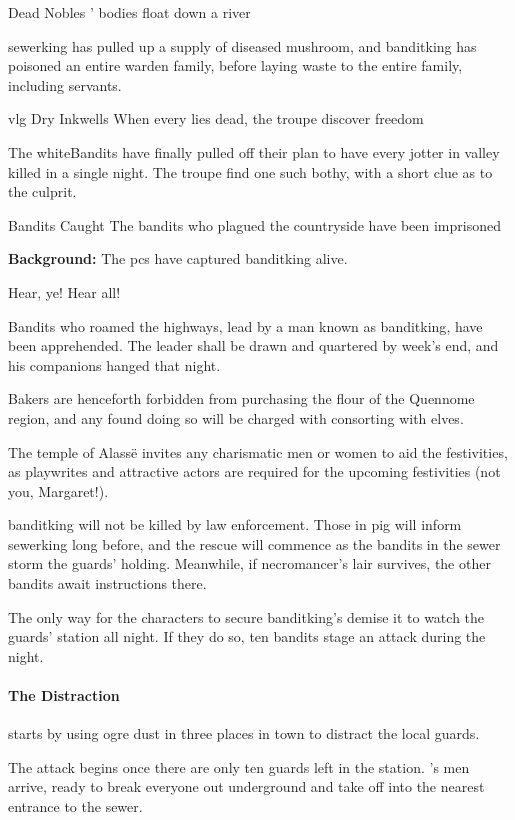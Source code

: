 {Dead Nobles}%
{' bodies float down a river}%

\Gls{sewerking} has pulled up a supply of diseased mushroom, and \gls{banditking} has poisoned an entire \gls{warden} family, before laying waste to the entire family, including servants.

{\gls{vlg} Dry Inkwells}%
{When every  lies dead, the troupe discover freedom}%

The \gls{whiteBandits} have finally pulled off their plan to have every \gls{jotter} in \gls{valley} killed in a single night.
The troupe find one such \gls{bothy}, with a short clue as to the culprit.

{Bandits Caught}%
{The bandits who plagued the countryside have been imprisoned}%

\textbf{Background:}
The \glspl{pc} have captured \gls{banditking} alive.

\begin{boxtext}

  Hear, ye!  Hear all!

  Bandits who roamed the highways, lead by a man known as \gls{banditking}, have been apprehended.  The leader shall be drawn and quartered by week's end, and his companions hanged that night.

  Bakers are henceforth forbidden from purchasing the flour of the Quennome region, and any found doing so will be charged with consorting with elves.

  The temple of Alass\"e invites any charismatic men or women to aid the festivities, as playwrites and attractive actors are required for the upcoming festivities (not you, Margaret!).

\end{boxtext}

\Gls{banditking} will not be killed by law enforcement.
Those in \gls{pig} will inform \gls{sewerking} long before, and the rescue will commence as the bandits in the sewer storm the guards' holding.
Meanwhile, if \gls{necromancer}'s lair survives, the other bandits await instructions there.


The only way for the characters to secure \gls{banditking}'s demise it to watch the guards' station all night.
If they do so, ten bandits stage an attack during the night.

\paragraph{The Distraction} starts by using ogre dust in three places in town to distract the local guards.

The attack begins once there are only ten guards left in the station.
's men arrive, ready to break everyone out underground and take off into the nearest entrance to the sewer.

\stopcontents[sq]


